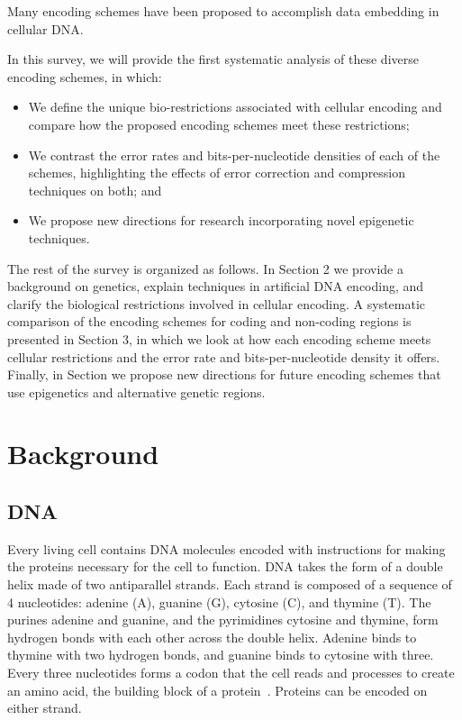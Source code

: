 \documentclass{bioinfo}
\begin{document}
Many encoding schemes have been proposed to accomplish data embedding in cellular DNA.

In this survey, we will provide the first systematic analysis of these diverse encoding schemes, in which:
\begin{itemize}
\item We define the unique bio-restrictions associated with cellular encoding and compare how the proposed encoding schemes meet these restrictions;
\item We contrast the error rates and bits-per-nucleotide densities of each of the schemes, highlighting the effects of error correction and compression techniques on both; and
\item We propose new directions for research incorporating novel epigenetic techniques.
\end{itemize}

The rest of the survey is organized as follows. In Section 2 we provide a background on genetics, explain techniques in artificial DNA encoding, and clarify the biological restrictions involved in cellular encoding. A systematic comparison of the encoding schemes for coding and non-coding regions is presented in Section 3, in which we look at how each encoding scheme meets cellular restrictions and the error rate and bits-per-nucleotide density it offers. Finally, in Section we propose new directions for future encoding schemes that use epigenetics and alternative genetic regions.


\section{Background}

\subsection{DNA}

Every living cell contains DNA molecules encoded with instructions for making the proteins necessary for the cell to function. DNA takes the form of a double helix made of two antiparallel strands. Each strand is composed of a sequence of 4 nucleotides: adenine (A), guanine (G), cytosine (C), and thymine (T). The purines adenine and guanine, and the pyrimidines cytosine and thymine, form hydrogen bonds with each other across the double helix. Adenine binds to thymine with two hydrogen bonds, and guanine binds to cytosine with three. Every three nucleotides forms a codon that the cell reads and processes to create an amino acid, the building block of a protein~\cite{WC1953N}. Proteins can be encoded on either strand.
\end{document}
